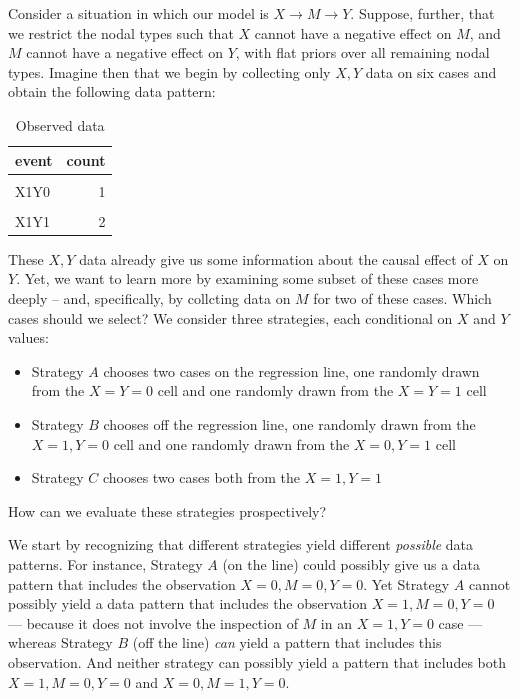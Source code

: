 \documentclass[
  12pt,
]{book}
\providecommand{\tightlist}{%
  \setlength{\itemsep}{0pt}\setlength{\parskip}{0pt}}
\begin{document}
Consider a situation in which our model is \(X \rightarrow M \rightarrow Y\). Suppose, further, that we restrict the nodal types such that \(X\) cannot have a negative effect on \(M\), and \(M\) cannot have a negative effect on \(Y\), with flat priors over all remaining nodal types. Imagine then that we begin by collecting only \(X,Y\) data on six cases and obtain the following data pattern:

\begin{table}

\caption{\label{tab:observed}Observed data}
\centering
\begin{tabular}[t]{lr}
\toprule
event & count\\
\midrule
\cellcolor{gray!6}{X0Y0} & \cellcolor{gray!6}{2}\\
X1Y0 & 1\\
\cellcolor{gray!6}{X0Y1} & \cellcolor{gray!6}{1}\\
X1Y1 & 2\\
\bottomrule
\end{tabular}
\end{table}

These \(X,Y\) data already give us some information about the causal effect of \(X\) on \(Y\). Yet, we want to learn more by examining some subset of these cases more deeply -- and, specifically, by collcting data on \(M\) for two of these cases. Which cases should we select? We consider three strategies, each conditional on \(X\) and \(Y\) values:

\begin{itemize}
\tightlist
\item
  Strategy \(A\) chooses two cases on the regression line, one randomly drawn from the \(X=Y=0\) cell and one randomly drawn from the \(X=Y=1\) cell
\item
  Strategy \(B\) chooses off the regression line, one randomly drawn from the \(X=1, Y=0\) cell and one randomly drawn from the \(X=0, Y=1\) cell
\item
  Strategy \(C\) chooses two cases both from the \(X=1, Y=1\)
\end{itemize}

How can we evaluate these strategies prospectively?

We start by recognizing that different strategies yield different \emph{possible} data patterns. For instance, Strategy \(A\) (on the line) could possibly give us a data pattern that includes the observation \(X=0, M=0, Y=0\). Yet Strategy \(A\) cannot possibly yield a data pattern that includes the observation \(X=1, M=0, Y=0\) --- because it does not involve the inspection of \(M\) in an \(X=1, Y=0\) case --- whereas Strategy \(B\) (off the line) \emph{can} yield a pattern that includes this observation. And neither strategy can possibly yield a pattern that includes both \(X=1, M=0, Y=0\) and \(X=0, M=1, Y=0\).
\end{document}
